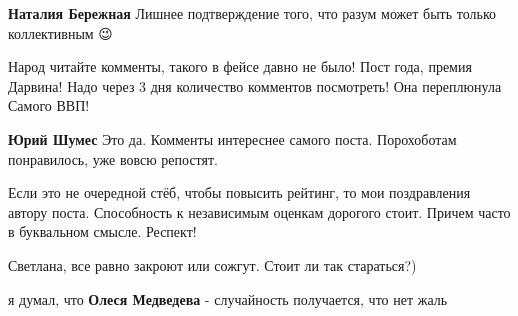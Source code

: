 \begin{itemize}
\begin{itemize}
\textbf{Наталия Бережная} Лишнее подтверждение того, что разум может быть только коллективным 😉
\end{itemize}

 
Народ читайте комменты, такого в фейсе давно не было! Пост года, премия
Дарвина! Надо через 3 дня количество комментов посмотреть! Она переплюнула
Самого ВВП!

\begin{itemize}
 
\textbf{Юрий Шумес} Это да.
Комменты интереснее самого поста.
Порохоботам понравилось, уже вовсю репостят.
\end{itemize}

 
Если это не очередной стёб, чтобы повысить рейтинг, то мои поздравления автору поста. Способность к независимым оценкам дорогого стоит. Причем часто в буквальном смысле. Респект!

 
Светлана, все равно закроют или сожгут. Стоит ли так стараться?)

 
я думал, что \textbf{Олеся Медведева} - случайность
получается, что нет
жаль

\begin{itemize}
 

\end{itemize}
\end{itemize}
